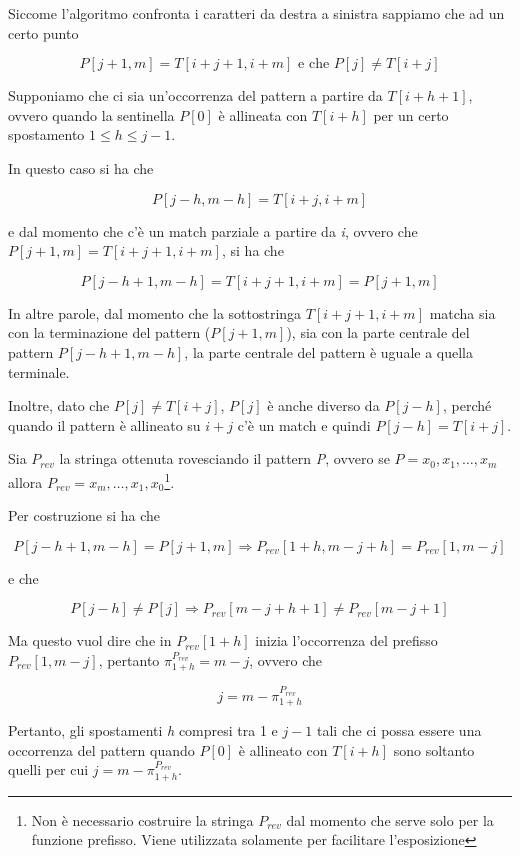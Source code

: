 Siccome l'algoritmo confronta i caratteri da destra a sinistra sappiamo
che ad un certo punto

$$
P[j + 1, m] = T[i + j + 1, i + m] \text{ e che } P[j] \neq T[i + j]
$$

Supponiamo che ci sia un'occorrenza del pattern a partire da $ T[i+h+1] $, ovvero quando la sentinella $P[0]$ è allineata con $ T[i+h] $ per un certo spostamento $ 1 \leq h \leq j -1 $.

In questo caso si ha che

$$
P[j-h, m-h] = T[i+j,i+m]
$$

e dal momento che c'è un match parziale a partire da \textit{i}, ovvero che$ P[j + 1, m] =  T[i + j + 1, i + m]$, si ha che 

$$
P[j - h +1,m -h] = T[i+j+1, i+m]  = P[j+1,m]
$$

In altre parole, dal momento che la sottostringa $ T[i+j+1, i+m] $ matcha sia con la terminazione del pattern ($ P[j+1,m] $), sia con la parte centrale del pattern $ P[j - h +1,m -h] $, la parte centrale del pattern è uguale a quella terminale.

Inoltre, dato che $ P[j] \neq T[i+j] $, $ P[j] $ è anche diverso da $ P[j-h] $, perché quando il pattern è allineato su $ i+j $ c'è un match e quindi $ P[j-h] = T[i+j] $.

Sia $ P_{rev} $ la stringa ottenuta rovesciando il pattern \textit{P}, ovvero se $ P = x_0,x_1,\ldots , x_m $ allora $ P_{rev} = x_m, \ldots, x_1, x_0 $\footnote{Non è necessario costruire la stringa $ P_{rev} $ dal momento che serve solo per la funzione prefisso. Viene utilizzata solamente per facilitare l'esposizione}.

Per costruzione si ha che

$$
P[j-h +1, m-h] = P[j+1,m] \Rightarrow P_{rev}[1+h, m-j+h] = P_{rev}[1,m-j]
$$

e che

$$
P[j-h] \neq P[j] \Rightarrow P_{rev}[m-j+h+1] \neq P_{rev}[m-j+1]
$$

Ma questo vuol dire che in $ P_{rev}[1+h] $ inizia l'occorrenza del prefisso $ P_{rev}[1,m-j] $, pertanto $\pi_{1+h}^{P_{rev}} = m -j$, ovvero che 

$$
j = m - \pi_{1+h}^{P_{rev}} 
$$

Pertanto, gli spostamenti \textit{h} compresi tra 1 e $j - 1$ tali che ci possa essere una occorrenza del pattern quando $ P[0] $ è allineato con $ T[i+h] $ sono soltanto quelli per cui $ j = m - \pi_{1+h}^{P_{rev}} $.

